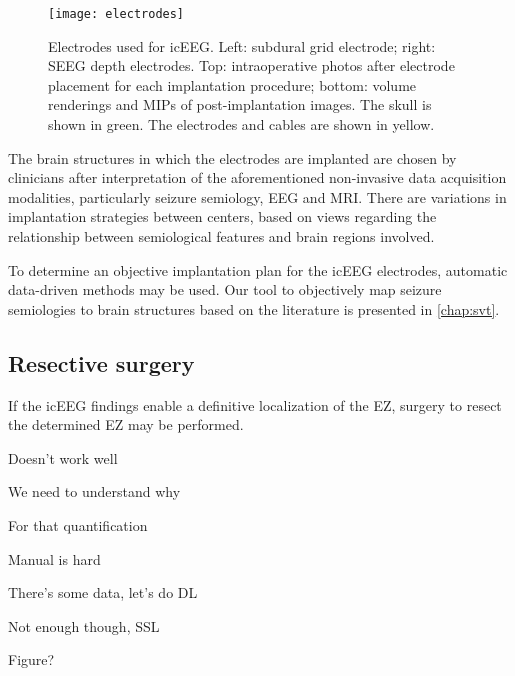 \begin{figure}
  \centering
  \texttt{[image: electrodes]}
  \caption[Electrodes used for intracranial EEG]{
    Electrodes used for \ac{icEEG}.
    Left: subdural grid electrode;
    right: \ac{SEEG} depth electrodes.
    Top: intraoperative photos after electrode placement for each implantation procedure;
    bottom: volume renderings and \acp{MIP} of post-implantation images.
    The skull is shown in green. The electrodes and cables are shown in yellow.
  }\label{fig:electrodes}
\end{figure}

The brain structures in which the electrodes are implanted are chosen by clinicians after interpretation of the aforementioned non-invasive data acquisition modalities, particularly seizure semiology, \ac{EEG} and \ac{MRI}.
There are variations in implantation strategies between centers, based on views regarding the relationship between semiological features and brain regions involved.

To determine an objective implantation plan for the \ac{icEEG} electrodes, automatic data-driven methods may be used.
Our tool to objectively map seizure semiologies to brain structures based on the literature is presented in \cref{chap:svt}.


\subsection{Resective surgery}

If the \ac{icEEG} findings enable a definitive localization of the \ac{EZ}, surgery to resect the determined \ac{EZ} may be performed.

Doesn't work well

We need to understand why

For that quantification

Manual is hard

There's some data, let's do DL

Not enough though, SSL

Figure?
